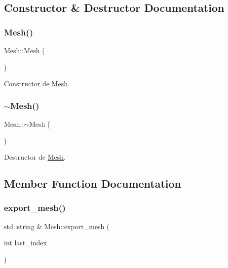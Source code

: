 \subsection{Constructor \& Destructor Documentation}
\mbox{\label{class_mesh_a2af137f1571af89172b9c102302c416b}} 
\subsubsection{\texorpdfstring{Mesh()}{Mesh()}}
{\footnotesize\ttfamily Mesh\+::\+Mesh (\begin{DoxyParamCaption}{ }\end{DoxyParamCaption})}



Constructor de \mbox{\hyperlink{class_mesh}{Mesh}}. 

\mbox{\label{class_mesh_a5efe4da1a4c0971cfb037bd70304c303}} 
\subsubsection{\texorpdfstring{$\sim$Mesh()}{~Mesh()}}
{\footnotesize\ttfamily Mesh\+::$\sim$\+Mesh (\begin{DoxyParamCaption}{ }\end{DoxyParamCaption})}



Destructor de \mbox{\hyperlink{class_mesh}{Mesh}}. 



\subsection{Member Function Documentation}
\mbox{\label{class_mesh_a6202023fe60714cd0762c64cdf17248e}} 
\subsubsection{\texorpdfstring{export\_mesh()}{export\_mesh()}}
{\footnotesize\ttfamily std\+::string \& Mesh\+::export\+\_\+mesh (\begin{DoxyParamCaption}\item[{int}]{last\+\_\+index }\end{DoxyParamCaption})}



